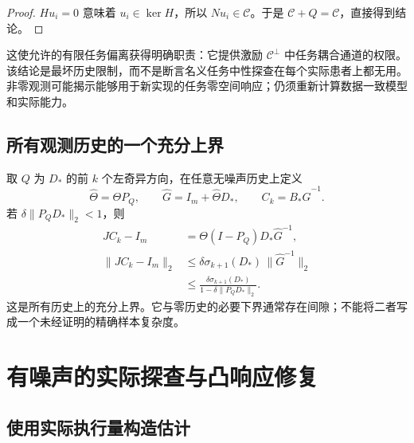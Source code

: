 \documentclass[11pt,a4paper]{article}
\numberwithin{equation}{section}
\theoremstyle{definition}
\begin{document}
\begin{proof}
$Hu_i=0$ 意味着 $u_i\in\ker H$，所以 $Nu_i\in\mathcal C$。于是 $\mathcal C+Q=\mathcal C$，直接得到结论。
\end{proof}

这使允许的有限任务偏离获得明确职责：它提供激励 $\mathcal C^\perp$ 中任务耦合通道的权限。该结论是最坏历史限制，而不是断言名义任务中性探查在每个实际患者上都无用。非零观测可能揭示能够用于新实现的任务零空间响应；仍须重新计算数据一致模型和实际能力。

\subsection{所有观测历史的一个充分上界}

取 $Q$ 为 $D_*$ 的前 $k$ 个左奇异方向，在任意无噪声历史上定义
\begin{equation}
  \widehat\Theta=\Theta P_Q,\qquad
  \widehat G=I_m+\widehat\Theta D_*,
  \qquad C_k=B_*\widehat G^{-1}.
\end{equation}
若 $\delta\|P_QD_*\|_2<1$，则
\begin{align}
  JC_k-I_m
  &=\Theta(I-P_Q)D_*\widehat G^{-1},\\
  \|JC_k-I_m\|_2
  &\le
  \delta\sigma_{k+1}(D_*)\,
  \|\widehat G^{-1}\|_2\\
  &\le
  \frac{\delta\sigma_{k+1}(D_*)}
  {1-\delta\|P_QD_*\|_2}.
  \label{eq:cal-nonzero-upper}
\end{align}
这是所有历史上的充分上界。它与零历史的必要下界通常存在间隙；不能将二者写成一个未经证明的精确样本复杂度。

\section{有噪声的实际探查与凸响应修复}
\label{sec:cal-noisy}

\subsection{使用实际执行量构造估计}
\end{document}
